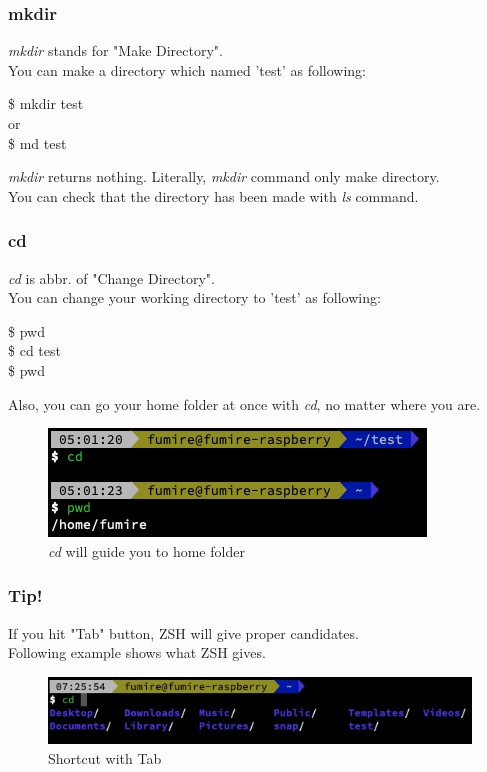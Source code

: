 \documentclass{beamer}
\begin{document}
	\begin{frame}
		\frametitle{mkdir}
		\textit{mkdir} stands for "Make Directory". \\
		You can make a directory which named 'test' as following: 
		\begin{example}
			\$ mkdir test \\
			or \\
			\$ md test \\
		\end{example}
		\textit{mkdir} returns nothing. Literally, \textit{mkdir} command only make directory. \\
		You can check that the directory has been made with \textit{ls} command. 
	\end{frame}

	\begin{frame}
		\frametitle{cd}
		\textit{cd} is abbr. of "Change Directory". \\
		You can change your working directory to 'test' as following:
		\begin{example}
			\$ pwd \\
			\$ cd test\\
			\$ pwd \\
		\end{example}
	
		Also, you can go your home folder at once with \textit{cd}, no matter where you are.
		\begin{figure}[h!]
			\centering
			\includegraphics[width=0.7 \linewidth]{figures/6.png}
			\caption{\textit{cd} will guide you to home folder}
		\end{figure}
	\end{frame}

	\begin{frame}
		\frametitle{Tip!}
		If you hit "Tab" button, ZSH will give proper candidates. \\
		Following example shows what ZSH gives.
		\begin{figure}
			\centering
			\includegraphics[width=0.7 \linewidth]{figures/10.png}
			\caption{Shortcut with Tab}
		\end{figure}
	\end{frame}
\end{document}
